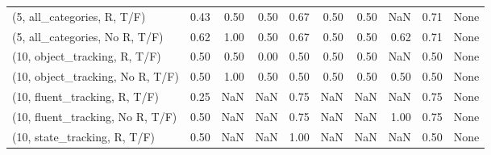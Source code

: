 \begin{table*}[h!]
\begin{adjustbox}{width=2\columnwidth,center}
\begin{tabular}{lrrr|rrr|rrr}
(5, all\_categories, R, T/F)          &                      0.43 &                  0.50 &                      0.50 &                          0.67 &                      0.50 &                          0.50 &                                    NaN &                               0.71 &                                  None \\
(5, all\_categories, No R, T/F)       &                      0.62 &                  1.00 &                      0.50 &                          0.67 &                      0.50 &                          0.50 &                                   0.62 &                               0.71 &                                  None \\



\midrule
(10, object\_tracking, R, T/F)         &                      0.50 &                  0.50 &                      0.00 &                          0.50 &                      0.50 &                          0.50 &                                    NaN &                               0.50 &                                  None \\
(10, object\_tracking, No R, T/F)      &                      0.50 &                  1.00 &                      0.50 &                          0.50 &                      0.50 &                          0.50 &                                   0.50 &                               0.50 &                                  None \\
(10, fluent\_tracking, R, T/F)         &                      0.25 &                   NaN &                       NaN &                          0.75 &                       NaN &                           NaN &                                    NaN &                               0.75 &                                  None \\
(10, fluent\_tracking, No R, T/F)      &                      0.50 &                   NaN &                       NaN &                          0.75 &                       NaN &                           NaN &                                   1.00 &                               0.75 &                                  None \\
(10, state\_tracking, R, T/F)          &                      0.50 &                   NaN &                       NaN &                          1.00 &                       NaN &                           NaN &                                    NaN &                               0.50 &                                  None \\

\end{tabular}
\end{adjustbox}
\end{table*}
